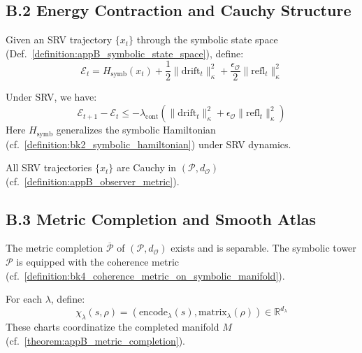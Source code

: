 \subsection*{B.2 Energy Contraction and Cauchy Structure}
\label{subsec:appB_cauchy}

\begin{definition}
\label{definition:appB_symbolic_energy}
Given an SRV trajectory $\{x_t\}$ through the symbolic state space (Def.~\ref{definition:appB_symbolic_state_space}), define:
\[
\mathcal{E}_t = H_{\text{symb}}(x_t) + \frac{1}{2}\|\text{drift}_t\|_\kappa^2 + \frac{\epsilon_{\mathcal{O}}}{2}\|\text{refl}_t\|_\kappa^2
\]
\end{definition}

\begin{lemma}
\label{lemma:appB_energy_contraction}
Under SRV, we have:
\[
\mathcal{E}_{t+1} - \mathcal{E}_t \leq -\lambda_{\text{cont}} \left( \|\text{drift}_t\|_\kappa^2 + \epsilon_{\mathcal{O}}\|\text{refl}_t\|_\kappa^2 \right)
\]
Here $H_{\text{symb}}$ generalizes the symbolic Hamiltonian (cf.~\ref{definition:bk2_symbolic_hamiltonian}) under SRV dynamics.
\end{lemma}

\begin{theorem}
\label{theorem:appB_srv_cauchy}
All SRV trajectories $\{x_t\}$ are Cauchy in $(\mathcal{P}, d_{\mathcal{O}})$ (cf.~\ref{definition:appB_observer_metric}).
\end{theorem}

\subsection*{B.3 Metric Completion and Smooth Atlas}
\label{subsec:appB_smooth_completion}

\begin{theorem}
\label{theorem:appB_metric_completion}
The metric completion $\overline{\mathcal{P}}$ of $(\mathcal{P}, d_{\mathcal{O}})$ exists and is separable.
The symbolic tower $\mathcal{P}$ is equipped with the coherence metric (cf.~\ref{definition:bk4_coherence_metric_on_symbolic_manifold}).
\end{theorem}

\begin{definition}
\label{definition:appB_symbolic_chart}
For each $\lambda$, define:
\[
\chi_\lambda(s, \rho) = (\text{encode}_\lambda(s), \text{matrix}_\lambda(\rho)) \in \mathbb{R}^{d_\lambda}
\]
These charts coordinatize the completed manifold $M$ (cf.~\ref{theorem:appB_metric_completion}).
\end{definition}

